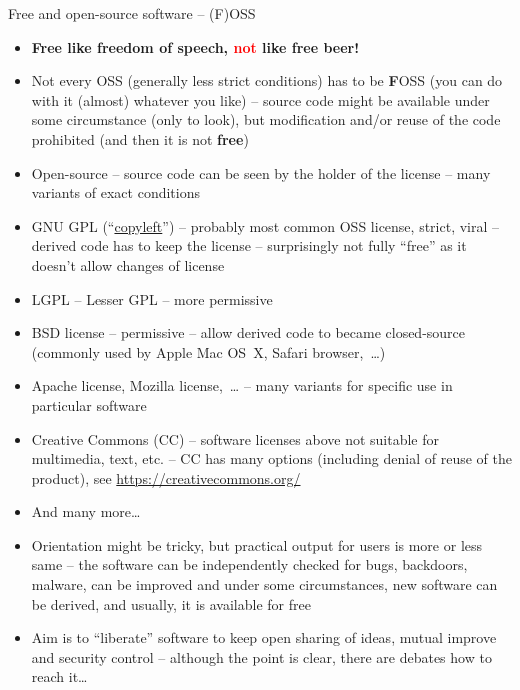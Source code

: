 \documentclass[compress, ucs, xelatex, 11pt, xcolor=svgnames,
  hyperref={
    bookmarks=true,
    unicode=true,
    colorlinks=true,
    pdftitle={Linux, command line and MetaCentrum},
    plainpages=false,
    pdfauthor={Vojtech Zeisek},
    pdfsubject={Course about use of Linux command line, writing shell scripts and using MetaCentrum of CESNET},
    pdfcreator={XeLaTeX},
    pdfkeywords={Linux, GNU, BASH, shell, command line, MetaCentrum},
    linkcolor=DarkRed,
    anchorcolor=DarkBlue,
    citecolor=Indigo,
    filecolor=NavyBlue,
    menucolor=DarkMagenta,
    urlcolor=DarkBlue,
    pdftex},
  url={hyphens, lowtilde} %
  ]{beamer}
\renewcommand{\alert}[1]{\textcolor{red}{#1}}
\begin{document}
\begin{frame}[allowframebreaks]{Free and open-source software -- (F)OSS}
  \begin{itemize}
    \item \textbf{Free like freedom of speech, \alert{not} like free beer!}
    \item Not every OSS (generally less strict conditions) has to be \textbf{F}OSS (you can do with it (almost) whatever you like) -- source code might be available under some circumstance (only to look), but modification and/or reuse of the code prohibited (and then it is not \textbf{free})
    \item Open-source -- source code can be seen by the holder of the license -- many variants of exact conditions
    \item GNU GPL (``\href{https://www.gnu.org/copyleft/}{copyleft}'') -- probably most common OSS license, strict, viral -- derived code has to keep the license -- surprisingly not fully ``free'' as it doesn't allow changes of license
    \item LGPL -- Lesser GPL -- more permissive
    \item BSD license -- permissive -- allow derived code to became closed-source (commonly used by Apple Mac OS~X, Safari browser,~\ldots)
    \item Apache license, Mozilla license,~\ldots{ }-- many variants for specific use in particular software
    \item Creative Commons (CC) -- software licenses above not suitable for multimedia, text, etc. -- CC has many options (including denial of reuse of the product), see \url{https://creativecommons.org/}
    \item And many more\ldots
    \item Orientation might be tricky, but practical output for users is more or less same -- the software can be independently checked for bugs, backdoors, malware, can be improved and under some circumstances, new software can be derived, and usually, it is available for free
    \item Aim is to ``liberate'' software to keep open sharing of ideas, mutual improve and security control -- although the point is clear, there are debates how to reach it\ldots
  \end{itemize}
\end{frame}
\end{document}
